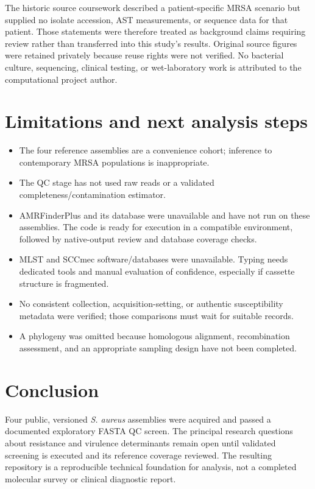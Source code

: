 \documentclass[11pt,a4paper]{article}
\begin{document}
The historic source coursework described a patient-specific MRSA scenario but supplied no isolate accession, AST measurements, or sequence data for that patient. Those statements were therefore treated as background claims requiring review rather than transferred into this study's results. Original source figures were retained privately because reuse rights were not verified. No bacterial culture, sequencing, clinical testing, or wet-laboratory work is attributed to the computational project author.

\section{Limitations and next analysis steps}
\begin{itemize}
\item The four reference assemblies are a convenience cohort; inference to contemporary MRSA populations is inappropriate.
\item The QC stage has not used raw reads or a validated completeness/contamination estimator.
\item AMRFinderPlus and its database were unavailable and have not run on these assemblies. The code is ready for execution in a compatible environment, followed by native-output review and database coverage checks.
\item MLST and SCCmec software/databases were unavailable. Typing needs dedicated tools and manual evaluation of confidence, especially if cassette structure is fragmented.
\item No consistent collection, acquisition-setting, or authentic susceptibility metadata were verified; those comparisons must wait for suitable records.
\item A phylogeny was omitted because homologous alignment, recombination assessment, and an appropriate sampling design have not been completed.
\end{itemize}

\section{Conclusion}
Four public, versioned \textit{S. aureus} assemblies were acquired and passed a documented exploratory FASTA QC screen. The principal research questions about resistance and virulence determinants remain open until validated screening is executed and its reference coverage reviewed. The resulting repository is a reproducible technical foundation for analysis, not a completed molecular survey or clinical diagnostic report.
\end{document}
